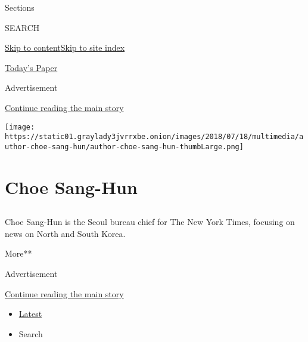 Sections

SEARCH

\protect\hyperlink{site-content}{Skip to
content}\protect\hyperlink{site-index}{Skip to site index}

\href{https://myaccount.nytimes3xbfgragh.onion/auth/login?response_type=cookie\&client_id=vi}{}

\href{https://www.nytimes3xbfgragh.onion/section/todayspaper}{Today's
Paper}

Advertisement

\protect\hyperlink{after-top}{Continue reading the main story}

\texttt{[image: https://static01.graylady3jvrrxbe.onion/images/2018/07/18/multimedia/author-choe-sang-hun/author-choe-sang-hun-thumbLarge.png]}

\hypertarget{choe-sang-hun}{%
\section{Choe Sang-Hun}\label{choe-sang-hun}}

\subsection{}

Choe Sang-Hun is the Seoul bureau chief for The New York Times, focusing
on news on North and South Korea.

More**

Advertisement

\protect\hyperlink{after-mid1}{Continue reading the main story}

\begin{itemize}
\tightlist
\item
  \protect\hyperlink{stream-panel}{Latest}
\item
  Search
\end{itemize}

